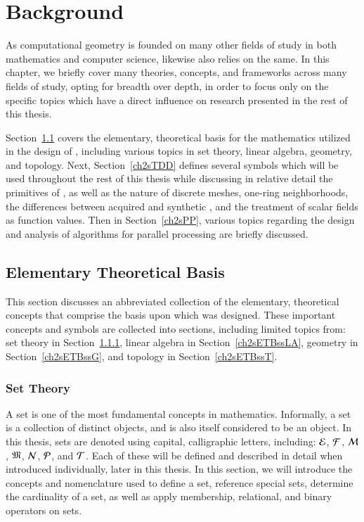 \chapter{Background}
\label{ch2}
As computational geometry is founded on many other fields of study in both mathematics and computer science, likewise  also relies on the same. In this chapter, we briefly cover many theories, concepts, and frameworks across many fields of study, opting for breadth over depth, in order to focus only on the specific topics which have a direct influence on research presented in the rest of this thesis.

Section~\ref{ch2sETB} covers the elementary, theoretical basis for the mathematics utilized in the design of , including various topics in set theory, linear algebra, geometry, and topology. Next, Section~\ref{ch2sTDD} defines several symbols which will be used throughout the rest of this thesis while discussing in relative detail the primitives of \tdd{}, as well as the nature of discrete meshes, one-ring neighborhoods, the differences between acquired and synthetic \tdd{}, and the treatment of scalar fields as function values. Then in Section~\ref{ch2sPP}, various topics regarding the design and analysis of algorithms for parallel processing are briefly discussed.

%
%
%
%
%
%
\section{Elementary Theoretical Basis}
\label{ch2sETB}
This section discusses an abbreviated collection of the elementary, theoretical concepts that comprise the basis upon which  was designed. These important concepts and symbols are collected into sections, including limited topics from: set theory in Section~\ref{ch2sETBssST}, linear algebra in Section~\ref{ch2sETBssLA}, geometry in Section~\ref{ch2sETBssG}, and topology in Section~\ref{ch2sETBssT}.

%
%
%
%
\subsection{Set Theory}
\label{ch2sETBssST}
A set is one of the most fundamental concepts in mathematics. Informally, a set is a collection of distinct objects, and is also itself considered to be an object. In this thesis, sets are denoted using capital, calligraphic letters, including: $\mathcal{E}$, $\mathcal{F}$, $\mathcal{M}$, $\mathfrak{M}$, $\mathcal{N}$, $\mathcal{P}$, and $\mathcal{T}$. Each of these will be defined and described in detail when introduced individually, later in this thesis. In this section, we will introduce the concepts and nomenclature used to define a set, reference special sets, determine the cardinality of a set, as well as apply membership, relational, and binary operators on sets.

